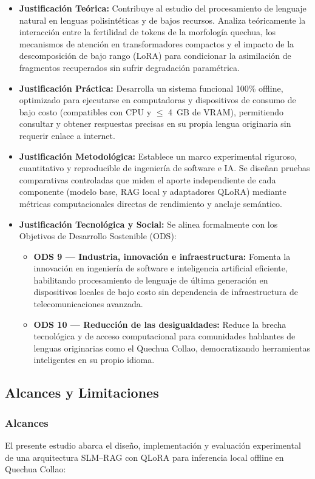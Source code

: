 \begin{itemize}
	\item \textbf{Justificación Teórica:} Contribuye al estudio del procesamiento de lenguaje natural en lenguas polisintéticas y de bajos recursos. Analiza teóricamente la interacción entre la fertilidad de tokens de la morfología quechua, los mecanismos de atención en transformadores compactos y el impacto de la descomposición de bajo rango (LoRA) para condicionar la asimilación de fragmentos recuperados sin sufrir degradación paramétrica.
	\item \textbf{Justificación Práctica:} Desarrolla un sistema funcional 100\% offline, optimizado para ejecutarse en computadoras y dispositivos de consumo de bajo costo (compatibles con CPU y $\le$ 4~GB de VRAM), permitiendo consultar y obtener respuestas precisas en su propia lengua originaria sin requerir enlace a internet.
	\item \textbf{Justificación Metodológica:} Establece un marco experimental riguroso, cuantitativo y reproducible de ingeniería de software e IA. Se diseñan pruebas comparativas controladas que miden el aporte independiente de cada componente (modelo base, RAG local y adaptadores QLoRA) mediante métricas computacionales directas de rendimiento y anclaje semántico.
	\item \textbf{Justificación Tecnológica y Social:} Se alinea formalmente con los Objetivos de Desarrollo Sostenible (ODS):
	\begin{itemize}
		\item \textbf{ODS 9 — Industria, innovación e infraestructura:} Fomenta la innovación en ingeniería de software e inteligencia artificial eficiente, habilitando procesamiento de lenguaje de última generación en dispositivos locales de bajo costo sin dependencia de infraestructura de telecomunicaciones avanzada.
		\item \textbf{ODS 10 — Reducción de las desigualdades:} Reduce la brecha tecnológica y de acceso computacional para comunidades hablantes de lenguas originarias como el Quechua Collao, democratizando herramientas inteligentes en su propio idioma.
	\end{itemize}
\end{itemize}

\subsection{Alcances y Limitaciones}

\subsubsection{Alcances}
El presente estudio abarca el diseño, implementación y evaluación experimental de una arquitectura SLM--RAG con QLoRA para inferencia local offline en Quechua Collao:

